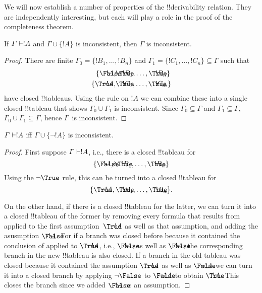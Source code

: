 \documentclass[../../../include/open-logic-section]{subfiles}
\begin{document}


We will now establish a number of properties of the !!{derivability}
relation.  They are independently interesting, but each will play a
role in the proof of the completeness theorem.

\begin{prop}
  If $\Gamma \Proves !A$ and $\Gamma \cup \{!A\}$ is
  inconsistent, then $\Gamma$ is inconsistent.
\end{prop}

\begin{proof}
There are finite $\Gamma_0 = \{!B_1, \dots, !B_n\}$ and $\Gamma_1
  =\{!C_1, \dots, !C_n\} \subseteq \Gamma$ such that
  \begin{align*}
    \{\sFmla{\False}{!A}, &
    \sFmla{\True}{!B_1}, \dots, \sFmla{\True}{!B_n}\} \\
    \{\sFmla{\True}{\lnot !A}, &
    \sFmla{\True}{!C_1}, \dots, \sFmla{\True}{!C_m}\}
  \end{align*}
  have closed !!{tableau}s.  Using the \Cut{} rule on $!A$ we can
  combine these into a single closed !!{tableau} that shows $\Gamma_0
  \cup \Gamma_1$ is inconsistent.  Since $\Gamma_0
  \subseteq \Gamma$ and $\Gamma_1 \subseteq \Gamma$, $\Gamma_0 \cup
  \Gamma_1 \subseteq \Gamma$, hence $\Gamma$~is inconsistent.
\end{proof}

\begin{prop}
$\Gamma \Proves !A$ iff $\Gamma \cup \{\lnot !A\}$ is inconsistent.
\end{prop}

\begin{proof}
First suppose $\Gamma \Proves !A$, i.e., there is
a closed !!{tableau} for
\[
\{\sFmla{\False}{!A},
\sFmla{\True}{!B_1}, \dots, \sFmla{\True}{!B_n}\}
\]
Using the $\TRule{\True}{\lnot}$ rule, this can be turned into a
closed !!{tableau} for
\[
\{\sFmla{\True}{\lnot !A},
\sFmla{\True}{!B_1}, \dots, \sFmla{\True}{!B_n}\}.
\]

On the other hand, if there is a closed !!{tableau} for the latter, we
can turn it into a closed !!{tableau} of the former by removing every
formula that results from \TRule{\True}{\lnot} applied to the first
assumption~$\sFmla{\True}{\lnot !A}$ as well as that assumption, and
adding the asusmption $\sFmla{\False}{!A}$. For if a branch was closed
before because it contained the conclusion of \TRule{\True}{\lnot}
applied to $\sFmla{\True}{\lnot !A}$, i.e., $\sFmla{\False}{!A}$, as
well as $\sFmla{\False}{!A}$, the corresponding branch in the new
!!{tableau} is also closed. If a branch in the old tableau was closed
because it contained the assumption $\sFmla{\True}{\lnot !A}$ as well
as $\sFmla{\False}{\lnot !A}$ we can turn it into a closed branch by
applying $\TRule{\False}{\lnot}$ to $\sFmla{\False}{\lnot !A}$ to
obtain $\sFmla{\True}{!A}$. This closes the branch since we added
$\sFmla{\False}{!A}$ as an assumption.
\end{proof}
\end{document}
